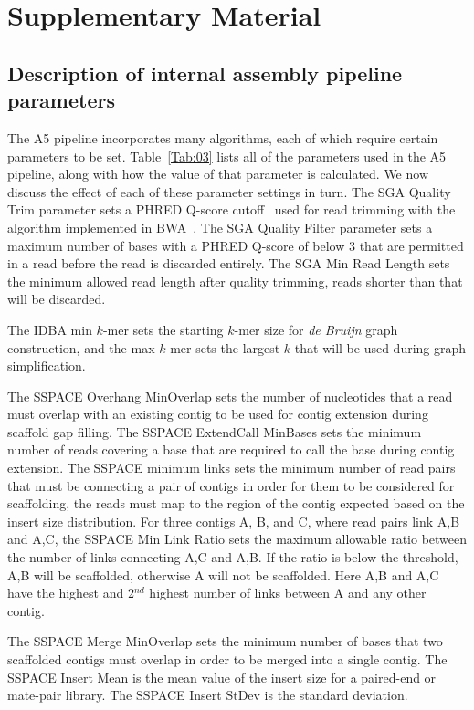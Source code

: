 \documentclass{bioinfo}
\begin{document}
\section{Supplementary Material}
\subsection{Description of internal assembly pipeline parameters}

The A5 pipeline incorporates many algorithms, each of which require certain parameters to be set.
Table~\ref{Tab:03} lists all of the parameters used in the A5 pipeline, along with how the value
of that parameter is calculated. We now discuss the effect of each of these parameter settings in turn.  
The SGA Quality Trim parameter sets a PHRED Q-score cutoff~\citep{Ewing1998} used for read trimming with the algorithm
implemented in BWA~\citep{bwa}. The SGA Quality Filter parameter sets a maximum number of bases
with a PHRED Q-score of below 3 that are permitted in a read before the read is discarded entirely.
The SGA Min Read Length sets the minimum allowed read length after quality trimming, reads shorter
than that will be discarded.

The IDBA min $k$-mer sets the starting $k$-mer size for \emph{de Bruijn} graph construction, and the max $k$-mer sets
the largest $k$ that will be used during graph simplification.

The SSPACE Overhang MinOverlap sets the number of nucleotides that a read must overlap with an existing
contig to be used for contig extension during scaffold gap filling. The SSPACE ExtendCall MinBases sets the minimum
number of reads covering a base that are required to call the base during contig extension. The SSPACE minimum
links sets the minimum number of read pairs that must be connecting a pair of contigs in order for them to be considered
for scaffolding, the reads must map to the region of the contig expected based on the insert size distribution.
For three contigs A, B, and C, where read pairs link A,B and A,C, the SSPACE Min Link Ratio sets the 
maximum allowable ratio between the number of links connecting A,C and A,B. If the ratio is below the threshold,
A,B will be scaffolded, otherwise A will not be scaffolded. Here A,B and A,C have the highest and 2$^{nd}$ highest number
of links between A and any other contig.

The SSPACE Merge MinOverlap sets the minimum number of bases that two scaffolded contigs must overlap in order to be merged
into a single contig.  The SSPACE Insert Mean is the mean value of the insert size for a paired-end or mate-pair library. 
The SSPACE Insert StDev is the standard deviation.
\end{document}

